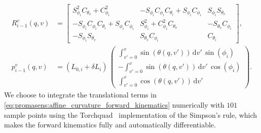 \begin{equation}\label{eq:promasens:affine_curvature_forward_kinematics}
\begin{split}
    R_{i-1}^v(q,v) &= \begin{bmatrix}
        S_{\phi_i}^2 C_{\theta_v} + C_{\phi_i}^2 & -S_{\phi_i} C_{\phi_i} C_{\theta_i} + S_{\phi_i}C_{\phi_i} & S_{\phi_i} S_{\theta_v}\\
        -S_{\phi_i} C_{\phi_i} C_{\theta_i} + S_{\phi_i} C_{\phi_i} & S_{\phi_i}^2 + C_{\phi_i}^2 C_{\theta_v} & -S_{\theta_v} C_{\phi_i}\\
        -S_{\phi_i} S_{\theta_v} & S_{\theta_v} C_{\phi_i} & C_{\theta_i}
    \end{bmatrix},\\
    p_{i-1}^{v}(q,v) &= \left ( L_{0,i} + \delta L_i \right ) \, \begin{pmatrix}
        \int_{v'=0}^{v} \sin(\theta(q, v')) \, \mathrm{d}v' \, \sin(\phi_i)\\
        - \int_{v'=0}^{v} \sin(\theta(q, v')) \, \mathrm{d}v' \, \cos(\phi_i)\\
        \int_{v'=0}^{v} \cos(\theta(q, v')) \, \mathrm{d}v'
    \end{pmatrix}.
\end{split}
\end{equation}
We choose to integrate the translational terms in \eqref{eq:promasens:affine_curvature_forward_kinematics} numerically with $101$ sample points using the Torchquad~\citep{gomez2021torchquad} implementation of the Simpson's rule, which makes the forward kinematics fully and automatically differentiable.


